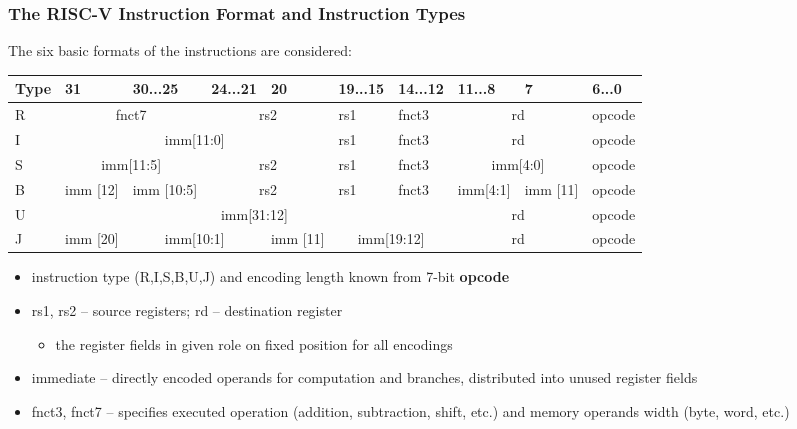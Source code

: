\documentclass{beamer}
\begin{document}
\begin{frame}
\frametitle{The RISC-V Instruction Format and Instruction Types}

The six basic formats of the instructions are considered:
\begin{table}
\footnotesize
\begin{tabular}{|m{0.4cm}|m{0.4cm}|m{1.0cm}|m{1.0cm}|m{0.4cm}|m{1.0cm}|m{1.0cm}|m{1.0cm}|m{0.4cm}|m{1.0cm}|}\hline
Type & 31 & 30...25 & 24...21 & 20 & 19...15 & 14...12 & 11...8 & 7 & 6...0 \\ \hline
R & \multicolumn{2}{c|}{ fnct7 } & \multicolumn{2}{c|}{ rs2 } & rs1 & fnct3 &\multicolumn{2}{c|}{ rd } & opcode\\ \hline
I & \multicolumn{4}{c|}{ imm[11:0] } & rs1 & fnct3 &\multicolumn{2}{c|}{ rd } & opcode\\ \hline
S & \multicolumn{2}{c|}{ imm[11:5] } & \multicolumn{2}{c|}{ rs2 } & rs1 & fnct3 &\multicolumn{2}{c|}{ imm[4:0] } & opcode\\ \hline
B & imm [12] & imm [10:5]  & \multicolumn{2}{c|}{ rs2 } & rs1 & fnct3 & imm[4:1]& imm [11] & opcode\\ \hline
U & \multicolumn{6}{c|}{ imm[31:12] }  & \multicolumn{2}{c|}{ rd } & opcode\\ \hline
J & imm [20] & \multicolumn{2}{c|}{ imm[10:1] } & imm [11] & \multicolumn{2}{c|}{ imm[19:12] } & \multicolumn{2}{c|}{ rd } & opcode\\ \hline
\end{tabular}
\end{table}

\begin{itemize}
\item instruction type (R,I,S,B,U,J) and encoding length known from 7-bit \textbf{opcode}
\item rs1, rs2 -- source registers; rd -- destination register
\begin{itemize}
\item the register fields in given role on fixed position for all encodings
\end{itemize}
\item immediate -- directly encoded operands for computation and branches, distributed into unused register fields
\item fnct3, fnct7 -- specifies executed operation (addition, subtraction, shift, etc.) and memory operands width (byte, word, etc.)
\end{itemize}

\end{frame}
\end{document}
